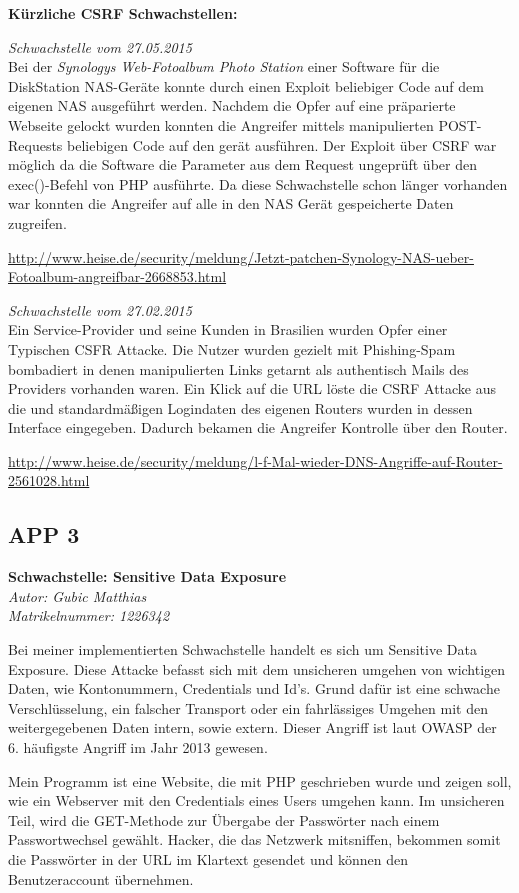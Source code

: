 \documentclass[12pt,a4paper,titlepage,oneside]{scrartcl}
\begin{document}
{\large \textbf{Kürzliche CSRF Schwachstellen:}}

\emph{Schwachstelle vom 27.05.2015}\\
Bei der \textit{Synologys Web-Fotoalbum Photo Station} einer Software für die DiskStation NAS-Geräte konnte 
durch einen Exploit beliebiger Code auf dem eigenen NAS ausgeführt werden.
Nachdem die Opfer auf eine präparierte Webseite gelockt wurden konnten die Angreifer mittels manipulierten POST-Requests 
beliebigen Code auf den gerät ausführen.
Der Exploit über CSRF war möglich da die Software die Parameter aus dem Request ungeprüft über den exec()-Befehl von PHP ausführte.
Da diese Schwachstelle schon länger vorhanden war konnten die Angreifer auf alle in den NAS Gerät gespeicherte Daten zugreifen.

\url{http://www.heise.de/security/meldung/Jetzt-patchen-Synology-NAS-ueber-Fotoalbum-angreifbar-2668853.html}

\emph{Schwachstelle vom 27.02.2015}\\
Ein Service-Provider und seine Kunden in Brasilien wurden Opfer einer Typischen CSFR Attacke.
Die Nutzer wurden gezielt mit Phishing-Spam bombadiert in denen manipulierten Links getarnt als 
authentisch Mails des Providers vorhanden waren.
Ein Klick auf die URL löste die CSRF Attacke aus die und standardmäßigen Logindaten des eigenen Routers wurden 
in dessen Interface eingegeben. Dadurch bekamen die Angreifer Kontrolle über den Router. 

\url{http://www.heise.de/security/meldung/l-f-Mal-wieder-DNS-Angriffe-auf-Router-2561028.html}

\subsection{APP 3}
\textbf{{\large Schwachstelle:} Sensitive Data Exposure }\\
\emph{Autor: Gubic Matthias\\Matrikelnummer: 1226342}

Bei meiner implementierten Schwachstelle handelt es sich um Sensitive Data Exposure. Diese Attacke befasst sich mit dem unsicheren umgehen von wichtigen Daten, wie Kontonummern, Credentials und Id's. Grund dafür ist eine schwache Verschlüsselung, ein falscher Transport oder ein fahrlässiges Umgehen mit den weitergegebenen Daten intern, sowie extern. Dieser Angriff ist laut OWASP der 6. häufigste Angriff im Jahr 2013 gewesen.

Mein Programm ist eine Website, die mit PHP geschrieben wurde und zeigen soll, wie ein Webserver mit den Credentials eines Users umgehen kann. Im unsicheren Teil, wird die GET-Methode zur Übergabe der Passwörter nach einem Passwortwechsel gewählt. Hacker, die das Netzwerk mitsniffen, bekommen somit die Passwörter in der URL im Klartext gesendet und können den Benutzeraccount übernehmen.
\end{document}
